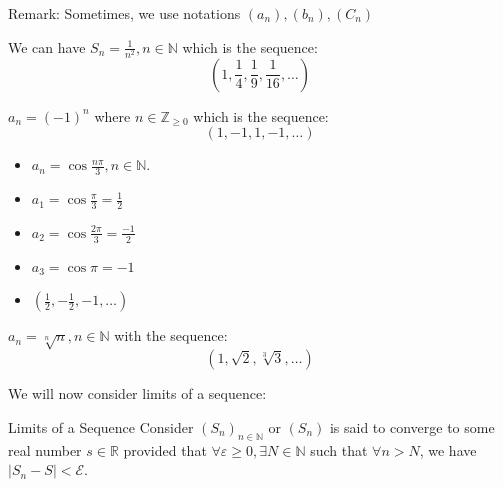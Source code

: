 \documentclass{report}
\begin{document}
Remark: Sometimes, we use notations $(a_{n}), (b_{n}), (C_{n})$

\begin{examples}
    \begin{example}
        We can have $S_{n} = \frac{1}{n^{2}}, n \in \mathbb{N}$ which is the sequence:
            \begin{equation*}
                (1, \dfrac{1}{4}, \dfrac{1}{9}, \dfrac{1}{16}, \ldots)
            \end{equation*}
    \end{example}
    \begin{example}
        $a_{n} = (-1)^{n}$ where $n \in \mathbb{Z}_{\geq 0}$ which is the sequence:
            \begin{equation*}
                (1, -1, 1, -1, \ldots)
            \end{equation*}
    \end{example}
    \begin{example}
        \begin{itemize}
            \item $a_{n} = \cos{\frac{n\pi}{3}}, n \in \mathbb{N}$.

            \item $a_{1} = \cos{\frac{\pi}{3}} = \frac{1}{2}$

            \item $a_{2} = \cos{\frac{2\pi}{3}} = \frac{-1}{2}$

            \item $a_{3} = \cos{\pi} = -1$

            \item $(\frac{1}{2}, -\frac{1}{2}, -1, \ldots)$ 
        \end{itemize}
    \end{example}
    \begin{example}
        $a_{n} = \sqrt[n]{n}, n \in \mathbb{N}$ with the sequence:
            \begin{equation*}
                (1, \sqrt{2}, \sqrt[3]{3}, \ldots)
            \end{equation*}
    \end{example}
\end{examples}

We will now consider limits of a sequence:
\begin{definition}{Limits of a Sequence}
    Consider $(S_{n})_{n \in \mathbb{N}} \text{ or } (S_{n})$ is said to converge to some real number $s \in \mathbb{R}$ provided that $\forall \varepsilon \geq 0, \exists N \in \mathbb{N}$ such that $\forall n >  N$, we have $\lvert S_{n} - S \rvert <  \mathcal{E}$.
\end{definition}
\end{document}
